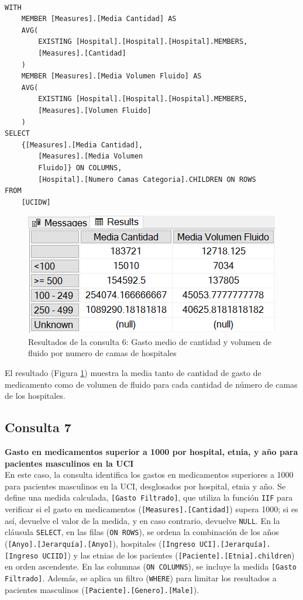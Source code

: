 \documentclass{article}
\begin{document}
\begin{lstlisting}[style=ddlstyle, label=lst:consulta6,caption=Consulta 6: Gasto medio de cantidad y volumen de fluido por numero de camas de hospitales]
	
WITH 
	MEMBER [Measures].[Media Cantidad] AS 
	AVG(
		EXISTING [Hospital].[Hospital].[Hospital].MEMBERS, 
		[Measures].[Cantidad]
	)
	MEMBER [Measures].[Media Volumen Fluido] AS 
	AVG(
		EXISTING [Hospital].[Hospital].[Hospital].MEMBERS, 
		[Measures].[Volumen Fluido]
	)
SELECT 
	{[Measures].[Media Cantidad], 
		[Measures].[Media Volumen
		Fluido]} ON COLUMNS, 
		[Hospital].[Numero Camas Categoria].CHILDREN ON ROWS
FROM 
	[UCIDW]
\end{lstlisting}

\begin{figure}[H]
	\centering
	\includegraphics[width=0.5\linewidth]{images/consulta6.png}
	\caption{Resultados de la consulta 6: Gasto medio de cantidad y volumen de fluido por numero de camas de hospitales}
	\label{fig:consulta6}
\end{figure}

El resultado (Figura \ref{fig:consulta6}) muestra la media tanto de cantidad de gasto de medicamento como de volumen de fluido para cada cantidad de número de camas de los hospitales.

\subsection{Consulta 7}

\textbf{Gasto en medicamentos superior a 1000 por hospital, etnia, y año para pacientes masculinos en la UCI}
\\

En este caso, la consulta identifica los gastos en medicamentos superiores a 1000 para pacientes masculinos en la UCI, desglosados por hospital, etnia y año. Se define una medida calculada, \texttt{[Gasto Filtrado]}, que utiliza la función \texttt{IIF} para verificar si el gasto en medicamentos (\texttt{[Measures].[Cantidad]}) supera 1000; si es así, devuelve el valor de la medida, y en caso contrario, devuelve \texttt{NULL}. En la cláusula \texttt{SELECT}, en las filas (\texttt{ON ROWS}), se ordena la combinación de los años (\texttt{[Anyo].[Jerarquía].[Anyo]}), hospitales (\texttt{[Ingreso UCI].[Jerarquía].[Ingreso UCIID]}) y las etnias de los pacientes (\texttt{[Paciente].[Etnia].children}) en orden ascendente. En las columnas (\texttt{ON COLUMNS}), se incluye la medida \texttt{[Gasto Filtrado]}. Además, se aplica un filtro (\texttt{WHERE}) para limitar los resultados a pacientes masculinos (\texttt{[Paciente].[Genero].[Male]}). 
\end{document}
